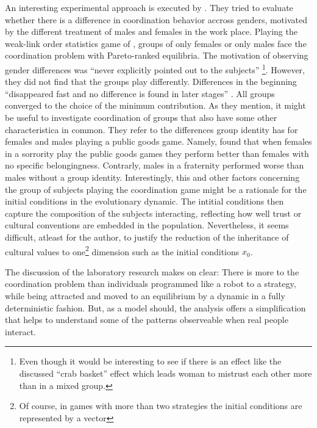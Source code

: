 An interesting experimental approach is executed by 
\textcite{dufwenberg_gender_2005}. They tried to evaluate whether 
there is a difference in coordination behavior accross genders, motivated by 
the different treatment of males and females in the work place. Playing the 
weak-link order statistics game of \textcite{van_huyck_tacit_1990}, groups of 
only females or only males face the coordination problem with Pareto-ranked 
equilibria. The motivation of observing gender differences was 
``never explicitly pointed  out to the subjects'' 
\parencite{dufwenberg_gender_2005}\footnote{
Even though it would be interesting to see if there is an effect like 
the discussed ``crab basket'' effect which leads woman to mistrust each other 
more than in a mixed group.}. However, they did not find that the groups play
differently. Differences in the beginning ``disappeared fast and no difference
is found in later stages'' \parencite[235]{dufwenberg_gender_2005}. 
All groups converged to the choice of the minimum
contribution. As they mention, it might be useful to investigate 
coordination of groups that also have some other 
characteristica in common. They refer to the differences group 
identity has for females and males playing a 
public goods game. Namely, \textcite{croson_groups_2008} found that when
females in a sorrority play the public goods games they perform better than 
females with no specific belongingness. Contrarly, males in a fraternity 
performed worse than males without a group identity. 
Interestingly, this and other factors concerning the group of subjects 
playing the coordination game might be a rationale for the 
initial conditions in the evolutionary dynamic. 
The intitial conditions then capture the composition of the subjects 
interacting, reflecting how well trust or cultural conventions 
are embedded in the population. 
Nevertheless, it seems difficult, atleast for the author, to justify
the reduction of the inheritance of cultural values to 
one\footnote{Of course, in games with more than two strategies 
the initial conditions are represented by a vector} dimension such 
as the initial conditions $x_0$.

The discussion of the laboratory research makes on clear: There is more
to the coordination problem than individuals programmed like a robot 
to a strategy, while being attracted and moved to an equilibrium by a 
dynamic in a fully deterministic fashion. But, as a model should, the 
analysis offers a simplification that helps to understand some of the 
patterns observeable when real people interact. 
